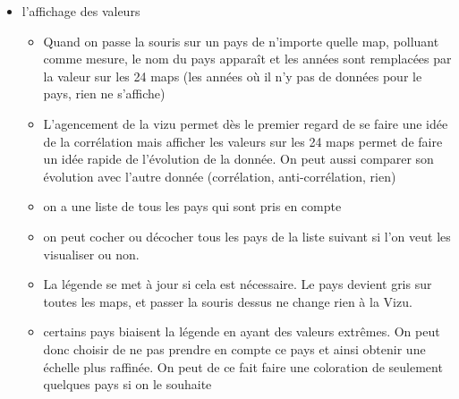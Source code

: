 \documentclass[preprint,journal]{vgtc}       %
\begin{document}
\begin{itemize}
		
		\item l’affichage des valeurs
			\begin{itemize}
				\item Quand on passe la souris sur un pays de n’importe quelle map, polluant comme mesure, le nom du pays apparaît et les années sont remplacées par la valeur sur les 24 maps (les années où il n’y pas de données pour le pays, rien ne s’affiche)
				\item L’agencement de la vizu permet dès le premier regard de se faire une idée de la corrélation mais afficher les valeurs sur les 24 maps permet de faire un idée rapide de l’évolution de la donnée. On peut aussi comparer son évolution avec l’autre donnée (corrélation, anti-corrélation, rien)
				\item on a une liste de tous les pays qui sont pris en compte
				\item on peut cocher ou décocher tous les pays de la liste suivant si l’on veut les visualiser ou non. 		
				\item La légende se met à jour si cela est nécessaire. Le pays devient gris sur toutes les maps, et passer la souris dessus ne change rien à la Vizu.
				\item certains pays biaisent la légende en ayant des valeurs extrêmes. On peut donc choisir de ne pas prendre en compte ce pays et ainsi obtenir une échelle plus raffinée. On peut de ce fait faire une coloration de seulement quelques pays si on le souhaite
			\end{itemize}
			
	\end{itemize}
\end{document}
